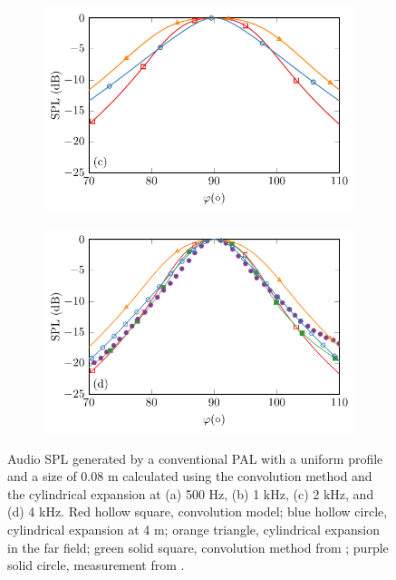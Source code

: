 \begin{figure}[!htb]
\begin{subfigure}{0.45\textwidth}
        \includegraphics[width = \textwidth]{fig/Shi2015JasaFig4_2000Hz_Compare_v3_211014E.pdf}
    \end{subfigure}
    \begin{subfigure}{0.45\textwidth}
        \centering
        \includegraphics[width = \textwidth]{fig/Shi2015JasaFig4_4000Hz_Compare_v4_211014F.pdf}
    \end{subfigure}
    \caption{Audio SPL  generated by a conventional PAL with a uniform profile and a size of 0.08 m calculated using the convolution method and the cylindrical expansion at (a) 500 Hz, (b) 1 kHz, (c) 2 kHz, and (d) 4 kHz.
    Red hollow square, convolution model; blue hollow circle, cylindrical expansion at 4 m; orange triangle, cylindrical expansion in the far field; green solid square, convolution method from \cite{Shi2015ConvolutionModelComputing}; purple solid circle, measurement from \cite{Shi2015ConvolutionModelComputing}.}
    \label{fig:cwe_result_compare}
\end{figure}

